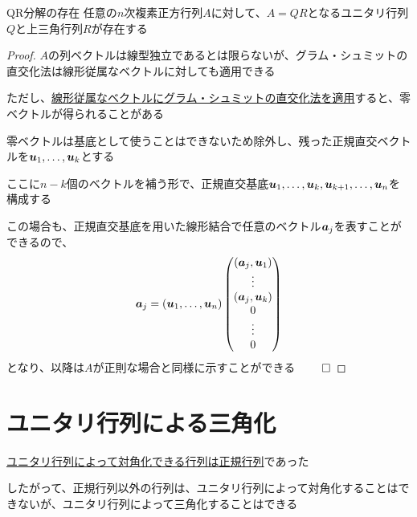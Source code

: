 \documentclass[../../../topic_linear-algebra]{subfiles}
\begin{document}
\begin{theorem*}{QR分解の存在}
  任意の$n$次複素正方行列$A$に対して、$A=QR$となるユニタリ行列$Q$と上三角行列$R$が存在する
\end{theorem*}

\begin{proof}
  $A$の列ベクトルは線型独立であるとは限らないが、グラム・シュミットの直交化法は線形従属なベクトルに対しても適用できる

  ただし、\hyperref[sec:gram-schmidt-with-dependent-vectors]{線形従属なベクトルにグラム・シュミットの直交化法を適用}すると、零ベクトルが得られることがある

  \br

  零ベクトルは基底として使うことはできないため除外し、残った正規直交ベクトルを$\vb*{u}_1,\ldots,\vb*{u}_k$とする

  ここに$n-k$個のベクトルを補う形で、正規直交基底$\vb*{u}_1,\ldots,\vb*{u}_k,\vb*{u}_{k+1},\ldots,\vb*{u}_n$を構成する

  \br

  この場合も、正規直交基底を用いた線形結合で任意のベクトル$\vb*{a}_j$を表すことができるので、
  \begin{equation*}
    \vb*{a}_j = (\vb*{u}_1,\ldots,\vb*{u}_n) \begin{pmatrix}
      (\vb*{a}_j, \vb*{u}_1) \\
      \vdots                 \\
      (\vb*{a}_j, \vb*{u}_k) \\
      0                      \\
      \vdots                 \\
      0
    \end{pmatrix}
  \end{equation*}
  となり、以降は$A$が正則な場合と同様に示すことができる $\qed$
\end{proof}

\sectionline
\section{ユニタリ行列による三角化}

\hyperref[thm:unitary-diagonalization-of-normal]{ユニタリ行列によって対角化できる行列は正規行列}であった

したがって、正規行列以外の行列は、ユニタリ行列によって対角化することはできないが、ユニタリ行列によって三角化することはできる
\end{document}
